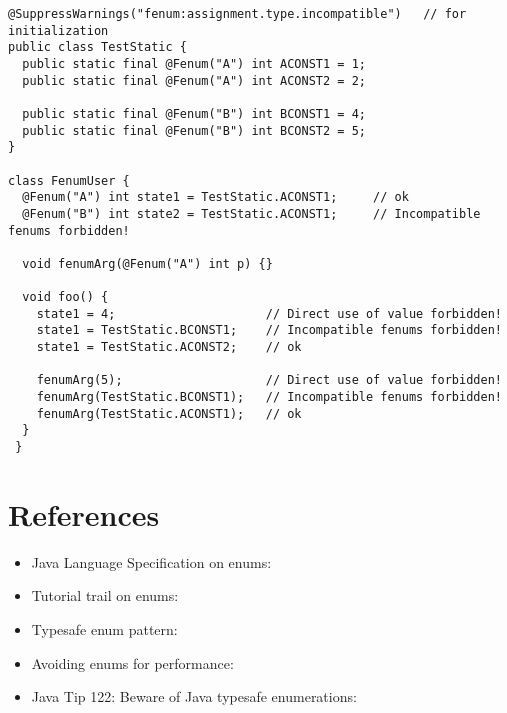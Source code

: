\begin{Verbatim}
@SuppressWarnings("fenum:assignment.type.incompatible")   // for initialization
public class TestStatic {
  public static final @Fenum("A") int ACONST1 = 1;
  public static final @Fenum("A") int ACONST2 = 2;

  public static final @Fenum("B") int BCONST1 = 4;
  public static final @Fenum("B") int BCONST2 = 5;
}

class FenumUser {
  @Fenum("A") int state1 = TestStatic.ACONST1;     // ok
  @Fenum("B") int state2 = TestStatic.ACONST1;     // Incompatible fenums forbidden!

  void fenumArg(@Fenum("A") int p) {}
	
  void foo() {
    state1 = 4;                     // Direct use of value forbidden!
    state1 = TestStatic.BCONST1;    // Incompatible fenums forbidden!
    state1 = TestStatic.ACONST2;    // ok

    fenumArg(5);                    // Direct use of value forbidden!
    fenumArg(TestStatic.BCONST1);   // Incompatible fenums forbidden!
    fenumArg(TestStatic.ACONST1);   // ok
  }
 }
\end{Verbatim}


\section{References\label{fenum-references}}

\begin{itemize}
\item Java Language Specification on enums:\\

\item Tutorial trail on enums:\\

\item Typesafe enum pattern:\\

\item Avoiding enums for performance:\\

\item Java Tip 122: Beware of Java typesafe enumerations:\\

\end{itemize}

